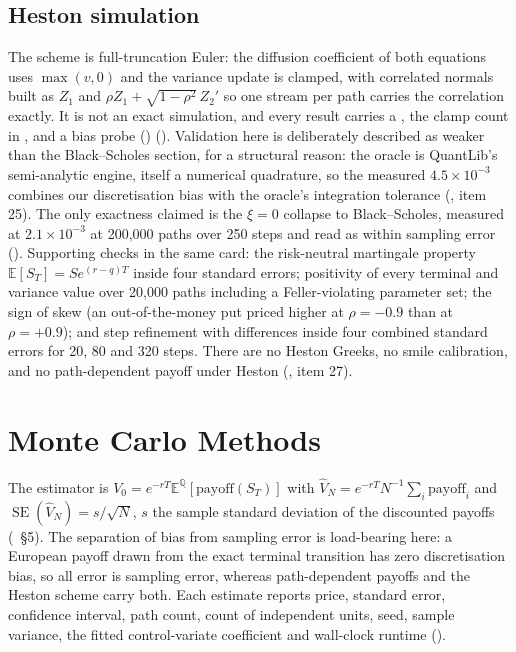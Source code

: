 \documentclass[11pt,a4paper]{article}
\begin{document}
\subsection{Heston simulation}
The scheme is full-truncation Euler: the diffusion coefficient of both equations uses
$\max(v,0)$ and the variance update is clamped, with correlated normals built as $Z_1$ and
$\rho Z_1 + \sqrt{1-\rho^2}\,Z_2'$ so one stream per path carries the correlation exactly. It
is not an exact simulation, and every result carries a , the clamp count in
, and a bias probe
() (). Validation here is
deliberately described as weaker than the Black--Scholes section, for a structural reason: the
oracle is QuantLib's semi-analytic engine, itself a numerical quadrature, so the measured
$4.5\times 10^{-3}$ combines our discretisation bias with the oracle's integration tolerance
(, item 25). The only exactness claimed is the $\xi = 0$ collapse to
Black--Scholes, measured at $2.1\times 10^{-3}$ at 200{,}000 paths over 250 steps and read as
within sampling error (). Supporting checks in the same card:
the risk-neutral martingale property $\mathbb{E}[S_T] = S e^{(r-q)T}$ inside four standard
errors; positivity of every terminal and variance value over 20{,}000 paths including a
Feller-violating parameter set; the sign of skew (an out-of-the-money put priced higher at
$\rho = -0.9$ than at $\rho = +0.9$); and step refinement with differences inside four
combined standard errors for 20, 80 and 320 steps. There are no Heston Greeks, no smile
calibration, and no path-dependent payoff under Heston
(, item 27).

\section{Monte Carlo Methods}
\label{sec:montecarlo}

The estimator is $V_0 = e^{-rT} \mathbb{E}^{\mathbb{Q}}[\text{payoff}(S_T)]$ with
$\widehat{V}_N = e^{-rT} N^{-1} \sum_i \text{payoff}_i$ and
$\operatorname{SE}(\widehat{V}_N) = s/\sqrt{N}$, $s$ the sample standard deviation of the
discounted payoffs (~\S5). The separation of bias from
sampling error is load-bearing here: a European payoff drawn from the exact terminal transition
has zero discretisation bias, so all error is sampling error, whereas path-dependent payoffs and
the Heston scheme carry both. Each estimate reports price, standard error, confidence interval,
path count, count of independent units, seed, sample variance, the fitted control-variate
coefficient and wall-clock runtime ().
\end{document}

